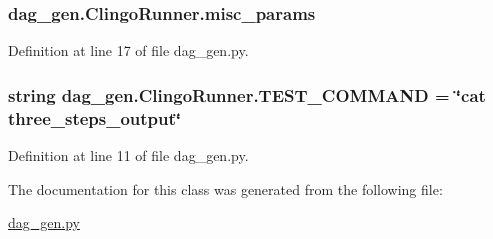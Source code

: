 \subsubsection[{misc\+\_\+params}]{\setlength{\rightskip}{0pt plus 5cm}dag\+\_\+gen.\+Clingo\+Runner.\+misc\+\_\+params}\label{classdag__gen_1_1_clingo_runner_a2b2372c6cc18c1448476a3630b82a949}


Definition at line 17 of file dag\+\_\+gen.\+py.

\hypertarget{classdag__gen_1_1_clingo_runner_aa7b89cf2eba47c9b33f009f34848be46}{}
\subsubsection[{T\+E\+S\+T\+\_\+\+C\+O\+M\+M\+A\+N\+D}]{\setlength{\rightskip}{0pt plus 5cm}string dag\+\_\+gen.\+Clingo\+Runner.\+T\+E\+S\+T\+\_\+\+C\+O\+M\+M\+A\+N\+D = \char`\"{}cat three\+\_\+steps\+\_\+output\char`\"{}\hspace{0.3cm}{\ttfamily [static]}}\label{classdag__gen_1_1_clingo_runner_aa7b89cf2eba47c9b33f009f34848be46}


Definition at line 11 of file dag\+\_\+gen.\+py.



The documentation for this class was generated from the following file\+:\begin{DoxyCompactItemize}
\item 
\hyperlink{dag__gen_8py}{dag\+\_\+gen.\+py}\end{DoxyCompactItemize}
